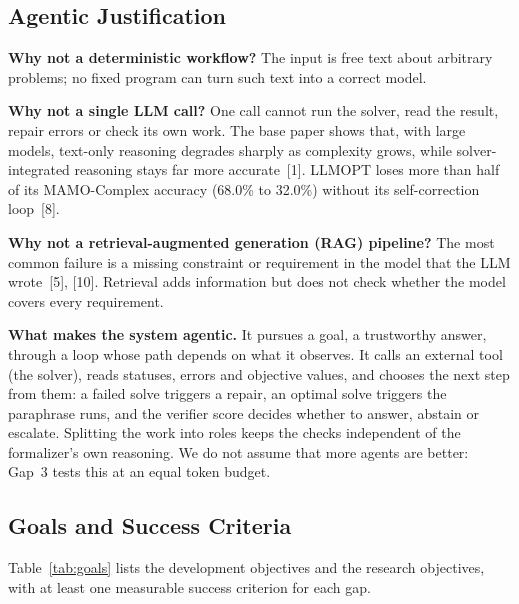 \documentclass[11pt,a4paper]{article}
\begin{document}
\subsection{Agentic Justification}

\textbf{Why not a deterministic workflow?} The input is free text about arbitrary problems; no fixed program can turn such text into a correct model.

\textbf{Why not a single LLM call?} One call cannot run the solver, read the result, repair errors or check its own work. The base paper shows that, with large models, text-only reasoning degrades sharply as complexity grows, while solver-integrated reasoning stays far more accurate~[1]. LLMOPT loses more than half of its MAMO-Complex accuracy (68.0\% to 32.0\%) without its self-correction loop~[8].

\textbf{Why not a retrieval-augmented generation (RAG) pipeline?} The most common failure is a missing constraint or requirement in the model that the LLM wrote~[5], [10]. Retrieval adds information but does not check whether the model covers every requirement.

\textbf{What makes the system agentic.} It pursues a goal, a trustworthy answer, through a loop whose path depends on what it observes. It calls an external tool (the solver), reads statuses, errors and objective values, and chooses the next step from them: a failed solve triggers a repair, an optimal solve triggers the paraphrase runs, and the verifier score decides whether to answer, abstain or escalate. Splitting the work into roles keeps the checks independent of the formalizer's own reasoning. We do not assume that more agents are better: Gap~3 tests this at an equal token budget.

\subsection{Goals and Success Criteria}

Table~\ref{tab:goals} lists the development objectives and the research objectives, with at least one measurable success criterion for each gap.
\end{document}
